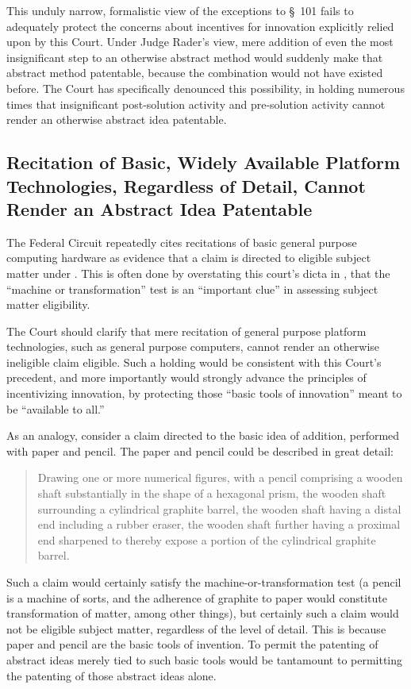 \documentclass{scotus}
\begin{document}
This unduly narrow, formalistic view of the exceptions to \S~101 fails to
adequately protect the concerns about incentives for innovation explicitly
relied upon by this Court. Under Judge Rader's view, mere addition of even the
most insignificant step to an otherwise abstract method would suddenly make that
abstract method patentable, because the combination would not have existed
before. The Court has specifically denounced this possibility, in holding
numerous times that insignificant post-solution activity and pre-solution
activity cannot render an otherwise abstract idea patentable.

\subsection{Recitation of Basic, Widely Available Platform Technologies,
Regardless of Detail, Cannot Render an Abstract Idea Patentable}

The Federal Circuit repeatedly cites recitations of basic general purpose
computing hardware as evidence that a claim is directed to eligible
subject matter under . This is often done by overstating this
court's dicta in , that the ``machine or transformation'' test is
an ``important clue'' in assessing subject matter eligibility.

The Court should clarify that mere recitation of general purpose platform
technologies, such as general purpose computers, cannot render an otherwise
ineligible claim eligible. Such a holding would be consistent with this Court's
precedent, and more importantly would strongly advance the principles of
incentivizing innovation, by protecting those ``basic tools of innovation''
meant to be ``available to all.''

As an analogy, consider a claim directed to the basic idea of addition,
performed with paper and pencil. The paper and pencil could be described in
great detail:
\begin{quote}
Drawing one or more numerical figures, with a pencil comprising a wooden shaft
substantially in the shape of a hexagonal prism, the wooden shaft surrounding a
cylindrical graphite barrel, the wooden shaft having a distal end including a
rubber eraser, the wooden shaft further having a proximal end sharpened to
thereby expose a portion of the cylindrical graphite barrel.
\end{quote}
Such a claim would certainly satisfy the machine-or-transformation test (a
pencil is a machine of sorts, and the adherence of graphite to paper would
constitute transformation of matter, among other things), but certainly such a
claim would not be eligible subject matter, regardless of the level of detail.
This is because paper and pencil are the basic tools of invention. To permit the
patenting of abstract ideas merely tied to such basic tools would be tantamount
to permitting the patenting of those abstract ideas alone.
\end{document}
